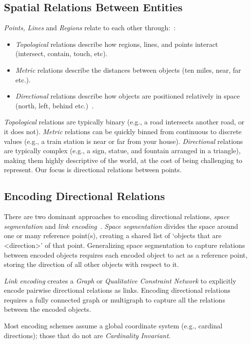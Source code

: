 \subsection{Spatial Relations Between Entities}
\par{
     \textit{Points, Lines} and \textit{Regions} relate to each other through:~\cite{Carniel2020,Bertella2022,Carniel2023}:
    \begin{itemize}
        \item \textit{Topological} relations describe how regions, lines, and points interact (intersect, contain, touch, etc).
        \item \textit{Metric} relations describe the distances between objects (ten miles, near, far etc.).
        \item \textit{Directional} relations describe how objects are positioned relatively in space (north, left, behind etc.)~\cite{Carniel2020, Bertella2022, Carniel2023}.
    \end{itemize}

    \textit{Topological} relations are typically binary (e.g., a road intersects another road, or it does not). 
    \textit{Metric} relations can be quickly binned from continuous to discrete values (e.g., a train station is near or far from your house).
    \textit{Directional} relations are typically complex (e.g., a sign, statue, and fountain arranged in a triangle), making them highly descriptive of the world, at the cost of being challenging to represent.
    Our focus is directional relations between points. 

}

\subsection{Encoding Directional Relations}
\par{
    There are two dominant approaches to encoding directional relations, \textit{space segmentation} and \textit{link encoding}~\cite{Dellapenna2012, Dellapenna2017}.
%
    \textit{Space segmentation} divides the space around one or many reference point(s), creating a shared list of `objects that are <direction>' of that point. 
    Generalizing space segmentation to capture relations between encoded objects requires each encoded object to act as a reference point, storing the direction of all other objects with respect to it.
 
    \textit{Link encoding} creates a \textit{Graph} or \textit{Qualitative Constraint Network} to explicitly encode pairwise directional relations as links.
    Encoding directional relations requires a fully connected graph or multigraph to capture all the relations between the encoded objects.

    Most encoding schemes assume a global coordinate system (e.g., cardinal directions); those that do not are \textit{Cardinality Invariant}.

}


